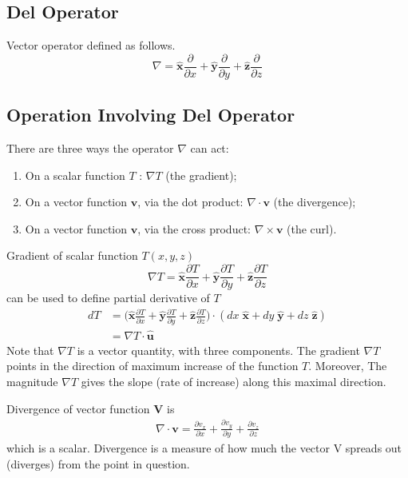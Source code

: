 \documentclass[../main.tex]{subfiles}
\begin{document}
\subsection*{Del Operator}
Vector operator defined as follows.
\begin{equation*}
    \nabla = \mathbf{\hat{x}}\frac{\partial}{\partial x}+\mathbf{\hat{y}}\frac{\partial}{\partial y}+\mathbf{\hat{z}}\frac{\partial}{\partial z}
\end{equation*}

\subsection*{Operation Involving Del Operator}
There are three ways the operator $\nabla$ can act:
\begin{enumerate}
    \item On a scalar function $T$ : $\nabla T$ (the gradient); 
    \item On a vector function $\mathbf{v}$, via the dot product: $\nabla \cdot \mathbf{v}$ (the divergence); 
    \item On a vector function $\mathbf{v}$, via the cross product: $\nabla \times \mathbf{v}$ (the curl).
\end{enumerate}

Gradient of scalar function $T(x,y,z)$  
\begin{equation*}
    \nabla T = \mathbf{\hat{x}}\frac{\partial T}{\partial x}+\mathbf{\hat{y}}\frac{\partial T}{\partial y}+\mathbf{\hat{z}}\frac{\partial T}{\partial z}
\end{equation*}
can be used to define partial derivative of $T$ 
\begin{align*}
    dT&= \bigg(  \mathbf{\hat{x}}\frac{\partial T}{\partial x}+ \mathbf{\hat{y}}\frac{\partial T}{\partial y}+ \mathbf{\hat{z}}\frac{\partial T}{\partial z} \bigg)\cdot (dx\;  \mathbf{\hat{x}}+dy\; \mathbf{\hat{y}}+dz\; \mathbf{\hat{z}})\\
    &=\nabla T \cdot \mathbf{\hat{u}}
\end{align*}
Note that $\nabla T$ is a vector quantity, with three components. The gradient $\nabla T$ points in the direction of maximum increase of the function $T$. Moreover, The magnitude $\nabla T$ gives the slope (rate of increase) along this maximal direction.

Divergence of vector function \textbf{V} is
\begin{align*}
    \nabla \cdot  \mathbf{v}= \frac{\partial v_x}{\partial x}+\frac{\partial v_y}{\partial y}+\frac{\partial v_z}{\partial z}
\end{align*}
which is a scalar. Divergence is a measure of how much the vector V spreads out (diverges) from the point in question.
\end{document}
